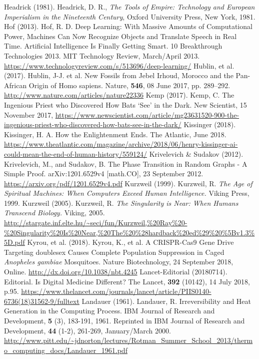 \begin{multicols}{2}
\begin{thebibliography}{99}
 Headrick (1981). Headrick, D. R., \textit{The Tools of Empire: Technology and European Imperialism in the Nineteenth Century}, Oxford University Press, New York, 1981.
 Hof (2013). Hof, R. D. Deep Learning: With Massive Amounts of Computational Power, Machines Can Now Recognize Objects and Translate Speech in Real Time. Artificial Intelligence Is Finally Getting Smart. 10 Breakthrough Technologies 2013. MIT Technology Review, March/April 2013. \url{https://www.technologyreview.com/s/513696/deep-learning/}
 Hublin, et al. (2017). Hublin, J-J. et al. New Fossils from Jebel Irhoud, Morocco and the Pan-African Origin of Homo sapiens. Nature, \textbf{546}, 08 June 2017, pp. 289--292. \url{http://www.nature.com/articles/nature22336}
 Kemp (2017). Kemp, C. The Ingenious Priest who Discovered How Bats ‘See’ in the Dark. New Scientist, 15 November 2017, \url{https://www.newscientist.com/article/mg23631520-900-the-ingenious-priest-who-discovered-how-bats-see-in-the-dark/}
 Kissinger (2018). Kissinger, H. A. How the Enlightenment Ends. The Atlantic, June 2018. \url{https://www.theatlantic.com/magazine/archive/2018/06/henry-kissinger-ai-could-mean-the-end-of-human-history/559124/}
 Krivelevich \& Sudakov (2012). Krivelevich, M., and Sudakov, B. The Phase Transition in Random Graphs - A Simple Proof. arXiv:1201.6529v4 [math.CO], 23 September 2012. \url{https://arxiv.org/pdf/1201.6529v4.pdf}
 Kurzweil (1999). Kurzweil, R. \textit{The Age of Spiritual Machines: When Computers Exceed Human Intelligence.} Viking Press, 1999.
 Kurzweil (2005). Kurzweil, R. \textit{The Singularity is Near: When Humans Transcend Biology.} Viking, 2005. \url{http://stargate.inf.elte.hu/~seci/fun/Kurzweil,%20Ray%20-%20Singularity%20Is%20Near,%20The%20%28hardback%20ed%29%20%5Bv1.3%5D.pdf}
 Kyrou, et al. (2018). Kyrou, K., et al. A CRISPR-Cas9 Gene Drive Targeting doublesex Causes Complete Population Suppression in Caged \textit{Anopheles gambiae} Mosquitoes. Nature Biotechnology, 24 September 2018, Online. \url{http://dx.doi.org/10.1038/nbt.4245}
 Lancet-Editorial (20180714). Editorial. Is Digital Medicine Different? The Lancet, \textbf{392} (10142), 14 July 2018, p.95. \url{https://www.thelancet.com/journals/lancet/article/PIIS0140-6736(18)31562-9/fulltext}
 Landauer (1961). Landauer, R. Irreversibility and Heat Generation in the Computing Process. IBM Journal of Research and Development, \textbf{5} (3), 183-191, 1961. Reprinted in IBM Journal of Research and Development, \textbf{44} (1-2), 261-269, January/March 2000. \url{http://www.pitt.edu/~jdnorton/lectures/Rotman_Summer_School_2013/thermo_computing_docs/Landauer_1961.pdf}

\end{thebibliography}
\end{multicols}
